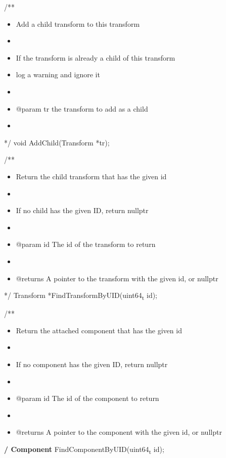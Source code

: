 \documentclass[11pt]{article}
\begin{document}
/**
\begin{itemize}
\item Add a child transform to this transform
\item 

\item If the transform is already a child of this transform
\item log a warning and ignore it
\item 

\item @param tr the transform to add as a child
\item 
\end{itemize}
 */
void AddChild(Transform *tr);

/**
\begin{itemize}
\item Return the child transform that has the given id
\item 

\item If no child has the given ID, return nullptr
\item 

\item @param id The id of the transform to return
\item 

\item @returns A pointer to the transform with the given id, or nullptr
\end{itemize}
 */
Transform *FindTransformByUID(uint64\textsubscript{t} id);

/**
\begin{itemize}
\item Return the attached component that has the given id
\item 

\item If no component has the given ID, return nullptr
\item 

\item @param id The id of the component to return
\item 

\item @returns A pointer to the component with the given id, or nullptr
\end{itemize}
 \textbf{/  
Component} FindComponentByUID(uint64\textsubscript{t} id);
\end{document}
